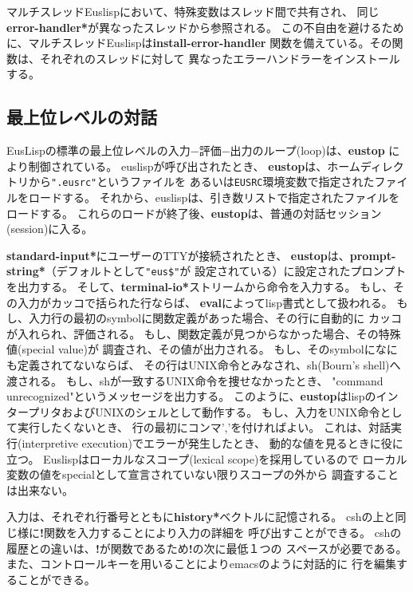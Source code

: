 マルチスレッドEuslispにおいて、特殊変数はスレッド間で共有され、
同じ{\bf *error-handler*}が異なったスレッドから参照される。
この不自由を避けるために、マルチスレッドEuslispは{\bf install-error-handler}
関数を備えている。その関数は、それぞれのスレッドに対して
異なったエラーハンドラーをインストールする。

\begin{refdesc}
\end{refdesc}

\newpage

\subsection{最上位レベルの対話}

EusLispの標準の最上位レベルの入力−評価−出力のループ(loop)は、{\bf eustop}
により制御されている。
euslispが呼び出されたとき、
{\bf eustop}は、ホームディレクトリから{\tt ".eusrc"}というファイルを
あるいは{\tt EUSRC}環境変数で指定されたファイルをロードする。
それから、euslispは、引き数リストで指定されたファイルをロードする。
これらのロードが終了後、{\bf eustop}は、普通の対話セッション(session)に入る。

{\bf *standard-input*}にユーザーのTTYが接続されたとき、
{\bf eustop}は、{\bf *prompt-string*}（デフォルトとして{\tt "eus\$"}が
設定されている）に設定されたプロンプトを出力する。
そして、{\bf *terminal-io*}ストリームから命令を入力する。
もし、その入力がカッコで括られた行ならば、
{\bf eval}によってlisp書式として扱われる。
もし、入力行の最初のsymbolに関数定義があった場合、その行に自動的に
カッコが入れられ、評価される。
もし、関数定義が見つからなかった場合、その特殊値(special value)が
調査され、その値が出力される。
もし、そのsymbolになにも定義されてないならば、
その行はUNIX命令とみなされ、sh(Bourn's shell)へ渡される。
もし、shが一致するUNIX命令を捜せなかったとき、
"command unrecognized"というメッセージを出力する。
このように、{\bf eustop}はlispのインタープリタおよびUNIXのシェルとして動作する。
もし、入力をUNIX命令として実行したくないとき、
行の最初にコンマ','を付ければよい。
これは、対話実行(interpretive execution)でエラーが発生したとき、
動的な値を見るときに役に立つ。
Euslispはローカルなスコープ(lexical scope)を採用しているので
ローカル変数の値をspecialとして宣言されていない限りスコープの外から
調査することは出来ない。

入力は、それぞれ行番号とともに{\bf *history*}ベクトルに記憶される。
cshの上と同じ様に{\bf !}関数を入力することにより入力の詳細を
呼び出すことができる。
cshの履歴との違いは、{\bf !}が関数であるため{\bf !}の次に最低１つの
スペースが必要である。
また、コントロールキーを用いることによりemacsのように対話的に
行を編集することができる。

